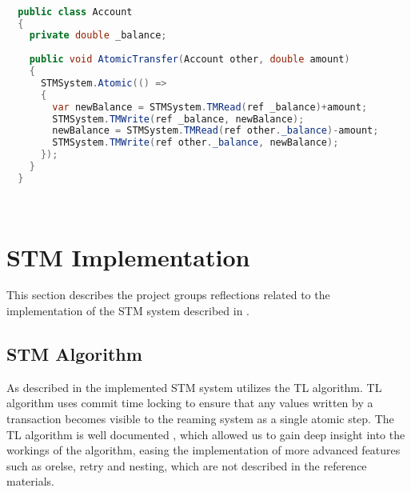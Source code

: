 \begin{lstlisting}[float,label=lst:lib_function_interface,
  caption={\ac{STM} library interfaced based on applying functions},
  language=Java,  
  showspaces=false,
  showtabs=false,
  breaklines=true,
  showstringspaces=false,
  breakatwhitespace=true,
  escapechar=~,
  commentstyle=\color{greencomments},
  keywordstyle=\color{bluekeywords},
  stringstyle=\color{redstrings},
  morekeywords={atomic, retry, orelse, var, get, set, ref, out}]  % Start your code-block

  public class Account
  {
  	private double _balance;
  	
    public void AtomicTransfer(Account other, double amount)
    {
      STMSystem.Atomic(() =>
      {
      	var newBalance = STMSystem.TMRead(ref _balance)+amount;
      	STMSystem.TMWrite(ref _balance, newBalance);
      	newBalance = STMSystem.TMRead(ref other._balance)-amount;
      	STMSystem.TMWrite(ref other._balance, newBalance);
      });
    }
  }

  
\end{lstlisting}
 
\section{STM Implementation}\label{sec:reflection_stm_implementation}
This section describes the project groups reflections related to the implementation of the \ac{STM} system described in .

\subsection{STM Algorithm}
As described in  the implemented \ac{STM} system utilizes the TL algorithm\cite{dice2006transactional}. TL algorithm uses commit time locking to ensure that any values written by a transaction becomes visible to the reaming system as a single atomic step. The TL algorithm is well documented \cite{dice2006transactional}\cite[p. 438]{herlihy2012art}\cite[p. 106]{harris2010transactional}, which allowed us to gain deep insight into the workings of the algorithm, easing the implementation of more advanced features such as orelse, retry and nesting, which are not described in the reference materials.

